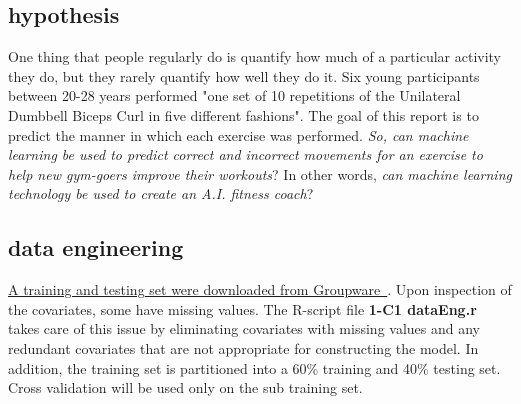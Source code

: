 \documentclass[10pt, twoside]{article}
\let\orighref\href
\renewcommand{\href}[2]{\orighref{#1}{#2\,\faExternalLink}}
\begin{document}
\noindent
\blindtext
\bigskip

\begin{center}
\subsection{hypothesis}
\vspace{-3ex}
\end{center}

\noindent
One thing that people regularly do is quantify how much of a particular activity they
do, but they rarely quantify how well they do it. Six young participants between 20-28 years
performed "one set of 10 repetitions of the Unilateral Dumbbell Biceps Curl in five
different fashions". The goal of this report is to predict the manner in which each exercise
was performed. \emph{So, can machine learning be used to predict correct and incorrect movements
for an exercise to help new gym-goers improve their workouts}? In other words, \emph{can machine
learning technology be used to create an A.I. fitness coach}? 
\bigskip

\begin{center}
\subsection{data engineering}
\vspace{-3ex}
\end{center}

\noindent
\href{http://web.archive.org/web/20161224072740/http:/groupware.les.inf.puc-rio.br/har}{A training and testing set were downloaded from Groupware  }.
Upon inspection of the covariates, some have missing values. The R-script file
\textbf{1-C1 dataEng.r} takes care of this issue by eliminating covariates with missing values
and any redundant covariates that are not appropriate for constructing the model. In
addition, the training set is partitioned into a 60\% training and 40\% testing set. Cross
validation will be used only on the sub training set.
\bigskip
\end{document}
